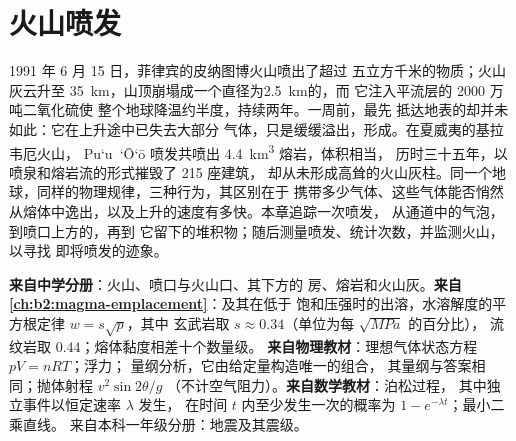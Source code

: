\chapter{火山喷发}\label{ch:b2:eruptive-styles}

1991 年 6 月 15 日，菲律宾的皮纳图博火山喷出了超过
五立方千米的物质；火山灰云升至
\qty{35}{km}，山顶崩塌成一个直径为\qty{2.5}{km}的，而
它注入平流层的 2000 万吨二氧化硫使
整个地球降温约半度，持续两年。一周前，最先
抵达地表的却并未如此：它在上升途中已失去大部分
气体，只是缓缓溢出，形成。在夏威夷的基拉韦厄火山，
Pu`u~`\=O`\=o 喷发共喷出 \qty{4.4}{km^3} 熔岩，体积相当，
历时三十五年，以喷泉和熔岩流的形式摧毁了 215 座建筑，
却从未形成高耸的火山灰柱。同一个地球，同样的物理规律，三种行为，其区别在于
携带多少气体、这些气体能否悄然
从熔体中逸出，以及上升的速度有多快。本章追踪一次喷发，
从通道中的气泡，到喷口上方的，再到
它留下的堆积物；随后测量喷发、统计次数，并监测火山，以寻找
即将喷发的迹象。

\begin{recall}
\textbf{来自中学分册}：火山、喷口与火山口、其下方的
房、熔岩和火山灰。\textbf{来自
\cref{ch:b2:magma-emplacement}}：及其在低于
饱和压强时的出溶，水溶解度的平方根定律 $w = s\sqrt p$，其中
玄武岩取 $s \approx 0.34$（单位为每 $\sqrt{\unit{MPa}}$ 的百分比），
流纹岩取 $0.44$；熔体黏度相差十个数量级。
\textbf{来自物理教材}：理想气体状态方程 $pV = nRT$；浮力；
量纲分析，它由给定量构造唯一的组合，
其量纲与答案相同；抛体射程 $v^2\sin 2\theta/g$
（不计空气阻力）。\textbf{来自数学教材}：泊松过程，
其中独立事件以恒定速率 $\lambda$ 发生，
在时间 $t$ 内至少发生一次的概率为 $1 - e^{-\lambda t}$；最小二乘直线。
来自本科一年级分册：地震及其震级。
\end{recall}


